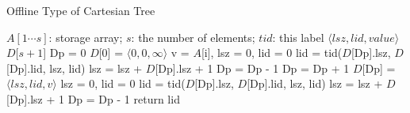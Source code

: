 \begin{algorithm*}
  \caption{Offline Type of Cartesian Tree}
  \label{alg:cartesian-encode-of}
  \begin{algorithmic}[1]
    \Require
      $A[1 \cdots s]$: storage array;
      $s$: the number of elements;
    \Ensure
      $\mathit{tid}$: this label
    \State $\langle\mathit{lsz},\mathit{lid},\mathit{value}\rangle$ $D$[$s+1$]
    \State Dp = 0
    \State $D$[0] = $\langle0,0,\infty\rangle$
      \State v = $A$[i], lsz = 0, lid = 0
        \State lid = tid($D$[Dp].lsz, $D$[Dp].lid, lsz, lid)
        \State lsz = lsz + $D$[Dp].lsz + 1
        \State Dp = Dp - 1
      \EndWhile
      \State Dp = Dp + 1
      \State $D$[Dp] = $\langle\mathit{lsz},\mathit{lid},\mathit{v}\rangle$
    \EndFor
    \State lsz = 0, lid = 0
     
      \State lid = tid($D$[Dp].lsz, $D$[Dp].lid, lsz, lid)
      \State lsz = lsz + $D$[Dp].lsz + 1
      \State Dp = Dp - 1
    \EndWhile
    return lid
  \end{algorithmic}
\end{algorithm*}